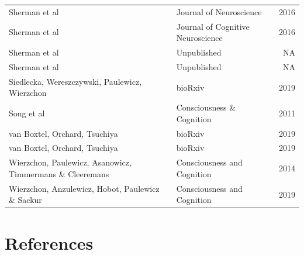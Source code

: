 \documentclass[
]{article}
\begin{document}
\begin{longtable}[t]{llr}
Sherman et al & Journal of Neuroscience & 2016\\
Sherman et al & Journal of Cognitive Neuroscience & 2016\\
Sherman et al & Unpublished & NA\\
Sherman et al & Unpublished & NA\\
\addlinespace
Siedlecka, Wereszczywski, Paulewicz, Wierzchon & bioRxiv & 2019\\
Song et al & Consciousness \& Cognition & 2011\\
van Boxtel, Orchard, Tsuchiya & bioRxiv & 2019\\
van Boxtel, Orchard, Tsuchiya & bioRxiv & 2019\\
Wierzchon, Paulewicz, Asanowicz, Timmermans \& Cleeremans & Consciousness and Cognition & 2014\\
\addlinespace
Wierzchon, Anzulewicz, Hobot, Paulewicz \& Sackur & Consciousness and Cognition & 2019\\*
\end{longtable}
\endgroup{}

\newpage

\hypertarget{references}{%
\section*{References}\label{references}}
\end{document}
